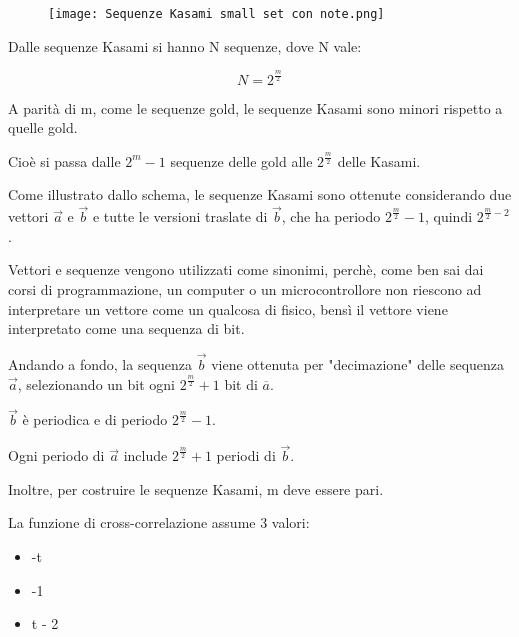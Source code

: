 \begin{figure}[h]
    \centering
    \texttt{[image: Sequenze Kasami small set con note.png]}
\end{figure}

Dalle sequenze Kasami si hanno N sequenze, 
dove N vale: 

{
    \Large 
    \begin{equation}
        N = 2^{\frac{m}{2}}
    \end{equation}
} 

A parità di m, 
come le sequenze gold,  
le sequenze Kasami sono minori rispetto a quelle gold. \newline 

Cioè si passa dalle $2^{m} - 1$ sequenze delle gold alle $2^{\frac{m}{2}}$ delle Kasami. \newline 

Come illustrato dallo schema, 
le sequenze Kasami sono ottenute considerando due vettori $\overrightarrow{a}$ e $\overrightarrow{b}$ 
e tutte le versioni traslate di $\overrightarrow{b}$, 
che ha periodo $2^{\frac{m}{2}} - 1$, quindi $2^{\frac{m}{2} - 2}$. \newline 

\begin{tcolorbox}
    Vettori e sequenze vengono utilizzati come sinonimi, 
    perchè, come ben sai dai corsi di programmazione, 
    un computer o un microcontrollore non riescono ad interpretare un vettore come un qualcosa di fisico, 
    bensì il vettore viene interpretato come una sequenza di bit. 
\end{tcolorbox}

Andando a fondo, 
la sequenza $\overrightarrow{b}$ viene ottenuta per "decimazione" 
delle sequenza $\overrightarrow{a}$, 
selezionando un bit ogni $2^{\frac{m}{2}} + 1 $ bit di $\overline{a}$. \newline 

$\overrightarrow{b}$ è periodica e di periodo $2^{\frac{m}{2}} - 1$. \newline 

Ogni periodo di $\overrightarrow{a}$ include $2^{\frac{m}{2}} + 1$ periodi di $\overrightarrow{b}$. \newline 

Inoltre, per costruire le sequenze Kasami, m deve essere pari. \newline 

La funzione di cross-correlazione assume 3 valori: 

\begin{itemize}
    \item -t 
    \item -1 
    \item t - 2
\end{itemize}


